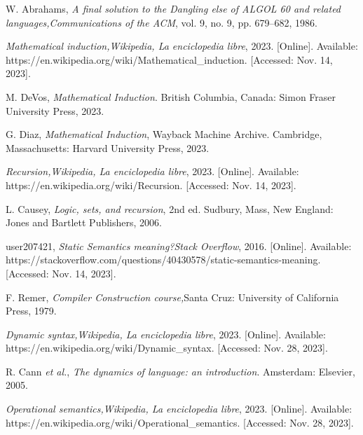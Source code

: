 \begin{thebibliography}{11}
    \label{sec:90}
    \hypertarget{90}{}
    W. Abrahams, \textit{A final solution to the Dangling else of ALGOL 60 and related languages,}\textit{Communications of the ACM}, vol. 9, no. 9, pp. 679–682, 1986.

    \label{sec:91}
    \hypertarget{91}{}
    \textit{Mathematical induction,}\textit{Wikipedia, La enciclopedia libre}, 2023. [Online]. Available: https://en.wikipedia.org/wiki/Mathematical\_induction. [Accessed: Nov. 14, 2023].

    \label{sec:92}
    \hypertarget{92}{}
    M. DeVos, \textit{Mathematical Induction}. British Columbia, Canada: Simon Fraser University Press, 2023.

    \label{sec:93}
    \hypertarget{93}{}
    G. Diaz, \textit{Mathematical Induction}, Wayback Machine Archive. Cambridge, Massachusetts: Harvard University Press, 2023.

    \label{sec:94}
    \hypertarget{94}{}
    \textit{Recursion,}\textit{Wikipedia, La enciclopedia libre}, 2023. [Online]. Available: https://en.wikipedia.org/wiki/Recursion. [Accessed: Nov. 14, 2023].

    \label{sec:95}
    \hypertarget{95}{}
    L. Causey, \textit{Logic, sets, and recursion}, 2nd ed. Sudbury, Mass, New England: Jones and Bartlett Publishers, 2006.

    \label{sec:96}
    \hypertarget{96}{}
    user207421, \textit{Static Semantics meaning?}\textit{Stack Overflow}, 2016. [Online]. Available: https://stackoverflow.com/questions/40430578/static-semantics-meaning. [Accessed: Nov. 14, 2023].

    \label{sec:97}
    \hypertarget{97}{}
    F. Remer, \textit{Compiler Construction course,}Santa Cruz: University of California Press, 1979.

    \label{sec:98}
    \hypertarget{98}{}
    \textit{Dynamic syntax,}\textit{Wikipedia, La enciclopedia libre}, 2023. [Online]. Available: https://en.wikipedia.org/wiki/Dynamic\_syntax. [Accessed: Nov. 28, 2023].

    \label{sec:99}
    \hypertarget{99}{}
    R. Cann \textit{et al.}, \textit{The dynamics of language: an introduction}. Amsterdam: Elsevier, 2005.

    \label{sec:100}
    \hypertarget{100}{}
    \textit{Operational semantics,}\textit{Wikipedia, La enciclopedia libre}, 2023. [Online]. Available: https://en.wikipedia.org/wiki/Operational\_semantics. [Accessed: Nov. 28, 2023].


\end{thebibliography}
